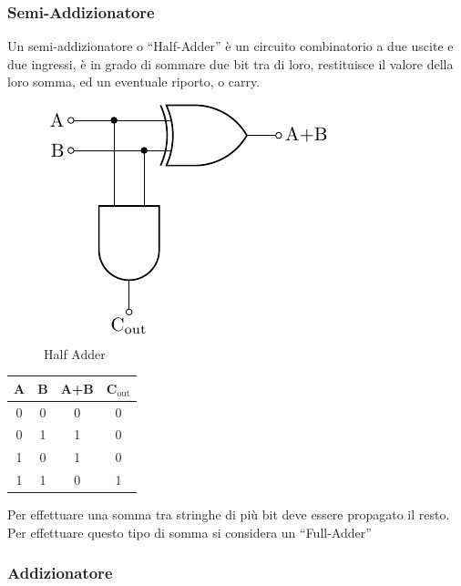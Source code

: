 \documentclass{article}
\numberwithin{equation}{subsection}
\begin{document}
\subsubsection{Semi-Addizionatore}

Un semi-addizionatore o ``Half-Adder'' è un circuito combinatorio a due uscite e due ingressi, è in grado di sommare due bit tra di loro, restituisce il valore della loro somma, ed un eventuale riporto, o carry. 

\begin{figure}[H]%
    \centering%
    \includegraphics[scale=0.9]{half-adder.pdf}%
    \caption{Half Adder}
\end{figure}
\begin{center}
    \begin{tabular}{|c|c||c|c|}
        \hline
        A&B&A+B&C$_{\mathrm{out}}$\\
        \hline\hline
        0&0&0&0\\
        \hline
        0&1&1&0\\
        \hline
        1&0&1&0\\
        \hline
        1&1&0&1\\
        \hline
    \end{tabular}
\end{center}
Per effettuare una somma tra stringhe di più bit deve essere propagato il resto. Per effettuare questo tipo di somma si considera un ``Full-Adder''

\subsubsection{Addizionatore}
\end{document}
